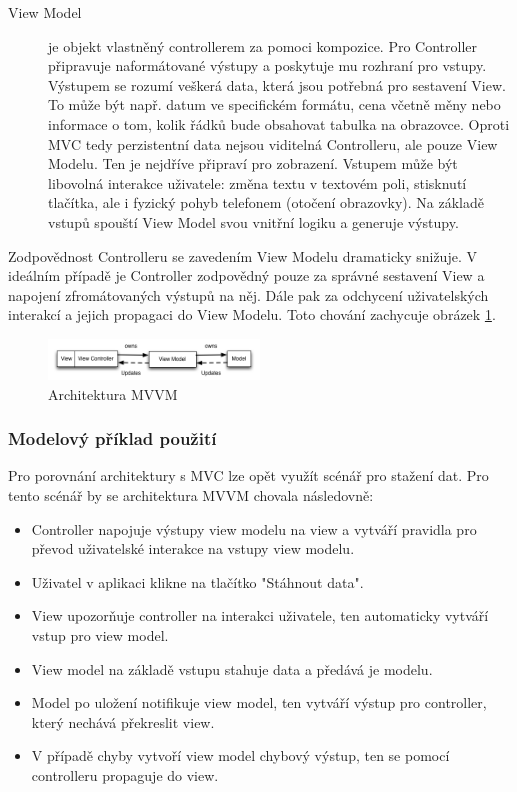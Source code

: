 \begin{description}
  \item[View Model] je objekt vlastněný controllerem za pomoci kompozice.
  Pro Controller připravuje naformátované výstupy a poskytuje mu rozhraní pro vstupy.
  Výstupem se rozumí veškerá data, která jsou potřebná pro sestavení View.
  To může být např. datum ve specifickém formátu, cena včetně měny nebo informace o tom, kolik řádků bude obsahovat tabulka na obrazovce.
  Oproti MVC tedy perzistentní data nejsou viditelná Controlleru, ale pouze View Modelu.
  Ten je nejdříve připraví pro zobrazení.
  Vstupem může být libovolná interakce uživatele:
  změna textu v textovém poli, stisknutí tlačítka, ale i fyzický pohyb telefonem (otočení obrazovky).
  Na základě vstupů spouští View Model svou vnitřní logiku a generuje výstupy.
\end{description}

Zodpovědnost Controlleru se zavedením View Modelu dramaticky snižuje.
V ideálním případě je Controller zodpovědný pouze za správné sestavení View a napojení zfromátovaných výstupů na něj.
Dále pak za odchycení uživatelských interakcí a jejich propagaci do View Modelu.
Toto chování zachycuje obrázek \ref{architektura-mvvm}.

\begin{figure}\centering
	\includegraphics[width=0.5\textwidth]{assets/mvvm-architecture.png}
	\caption[Architektura MVVM]{Architektura MVVM}\label{architektura-mvvm}
\end{figure}

\subsubsection{Modelový příklad použití} \label{architektura-mvvm-priklad}

Pro porovnání architektury s MVC lze opět využít scénář pro stažení dat. Pro tento scénář by se architektura MVVM chovala následovně:
\begin{itemize}
  \item Controller napojuje výstupy view modelu na view a vytváří pravidla pro převod uživatelské interakce na vstupy view modelu.
  \item Uživatel v aplikaci klikne na tlačítko "Stáhnout data".
  \item View upozorňuje controller na interakci uživatele, ten automaticky vytváří vstup pro view model.
  \item View model na základě vstupu stahuje data a předává je modelu.
  \item Model po uložení notifikuje view model, ten vytváří výstup pro controller, který nechává překreslit view.
  \item V případě chyby vytvoří view model chybový výstup, ten se pomocí controlleru propaguje do view.
\end{itemize}


